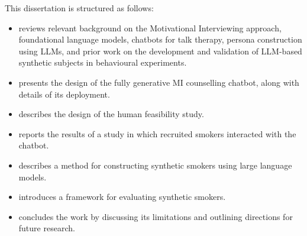 This dissertation is structured as follows:
\begin{itemize}
    \item {} reviews relevant background on the Motivational Interviewing approach, foundational language models, chatbots for talk therapy, persona construction using LLMs, and prior work on the development and validation of LLM-based synthetic subjects in behavioural experiments.
    \item {} presents the design of the fully generative MI counselling chatbot, along with details of its deployment.
    \item {} describes the design of the human feasibility study.
    \item {} reports the results of a study in which recruited smokers interacted with the chatbot.
    \item {} describes a method for constructing synthetic smokers using large language models.
    \item {} introduces a framework for evaluating synthetic smokers.
    \item {} concludes the work by discussing its limitations and outlining directions for future research.
\end{itemize}
